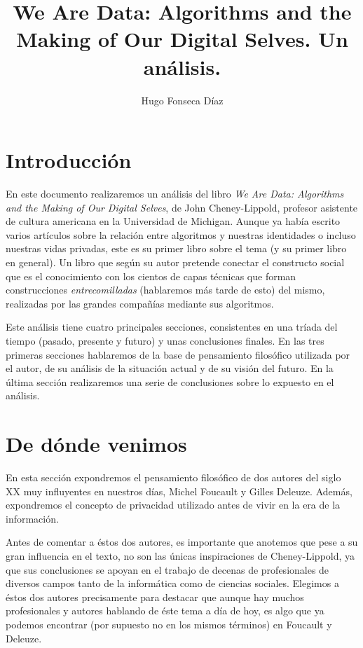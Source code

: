 \documentclass[11pt]{article}
\begin{document}
\title{We Are Data: Algorithms and the Making of Our Digital Selves. Un análisis.}
\author{Hugo Fonseca Díaz\\ }
\maketitle
\section{Introducción}
En este documento realizaremos un análisis del libro \textit{We Are Data: Algorithms and the Making of Our Digital Selves}, de John Cheney-Lippold, profesor asistente de cultura americana en la Universidad de Michigan. Aunque ya había escrito varios artículos sobre la relación entre algoritmos y nuestras identidades o incluso nuestras vidas privadas, este es su primer libro sobre el tema (y su primer libro en general). Un libro que según su autor pretende conectar el constructo social que es el conocimiento con los cientos de capas técnicas que forman construcciones \textit{entrecomilladas} (hablaremos más tarde de esto) del mismo, realizadas por las grandes compañías mediante sus algoritmos.

Este análisis tiene cuatro principales secciones, consistentes en una tríada del tiempo (pasado, presente y futuro) y unas conclusiones finales. En las tres primeras secciones hablaremos de la base de pensamiento filosófico utilizada por el autor, de su análisis de la situación actual y de su visión del futuro. En la última sección realizaremos una serie de conclusiones sobre lo expuesto en el análisis.
\section{De dónde venimos}
En esta sección expondremos el pensamiento filosófico de dos autores del siglo XX muy influyentes en nuestros días, Michel Foucault y Gilles Deleuze. Además, expondremos el concepto de privacidad utilizado antes de vivir en la era de la información.

Antes de comentar a éstos dos autores, es importante que anotemos que pese a su gran influencia en el texto, no son las únicas inspiraciones de Cheney-Lippold, ya que sus conclusiones se apoyan en el trabajo de decenas de profesionales de diversos campos tanto de la informática como de ciencias sociales. Elegimos a éstos dos autores precisamente para destacar que aunque hay muchos profesionales y autores hablando de éste tema a día de hoy, es algo que ya podemos encontrar (por supuesto no en los mismos términos) en Foucault y Deleuze. 
\end{document}
